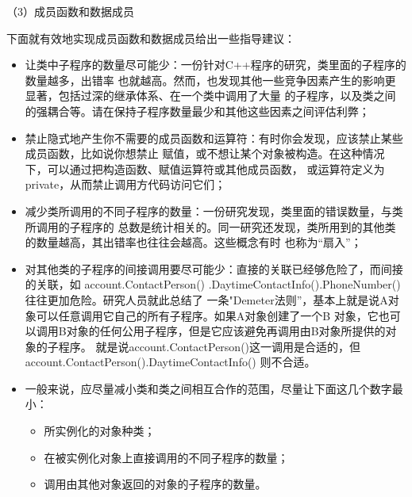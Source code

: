 \documentclass{article}
\begin{document}
\par
（3）成员函数和数据成员
\par
下面就有效地实现成员函数和数据成员给出一些指导建议：
\begin{itemize}
    \item 让类中子程序的数量尽可能少：一份针对C++程序的研究，类里面的子程序的数量越多，出错率
    也就越高。然而，也发现其他一些竞争因素产生的影响更显著，包括过深的继承体系、在一个类中调用了大量
    的子程序，以及类之间的强耦合等。请在保持子程序数量最少和其他这些因素之间评估利弊；
    \item 禁止隐式地产生你不需要的成员函数和运算符：有时你会发现，应该禁止某些成员函数，比如说你想禁止
    赋值，或不想让某个对象被构造。在这种情况下，可以通过把构造函数、赋值运算符或其他成员函数，
    或运算符定义为private，从而禁止调用方代码访问它们；
    \item 减少类所调用的不同子程序的数量：一份研究发现，类里面的错误数量，与类所调用的子程序的
    总数是统计相关的。同一研究还发现，类所用到的其他类的数量越高，其出错率也往往会越高。这些概念有时
    也称为“扇入”；
    \item 对其他类的子程序的间接调用要尽可能少：直接的关联已经够危险了，而间接的关联，如
    account.ContactPerson()
    .DaytimeContactInfo().PhoneNumber()往往更加危险。研究人员就此总结了
    一条"Demeter法则”，基本上就是说A对象可以任意调用它自己的所有子程序。如果A对象创建了一个B
    对象，它也可以调用B对象的任何公用子程序，但是它应该避免再调用由B对象所提供的对象的子程序。
    就是说account.ContactPerson()这一调用是合适的，但account.ContactPerson().DaytimeContactInfo()
    则不合适。
    \item 一般来说，应尽量减小类和类之间相互合作的范围，尽量让下面这几个数字最小：
    \begin{itemize}
        \item 所实例化的对象种类；
        \item 在被实例化对象上直接调用的不同子程序的数量；
        \item 调用由其他对象返回的对象的子程序的数量。
    \end{itemize}
\end{itemize}
\end{document}
